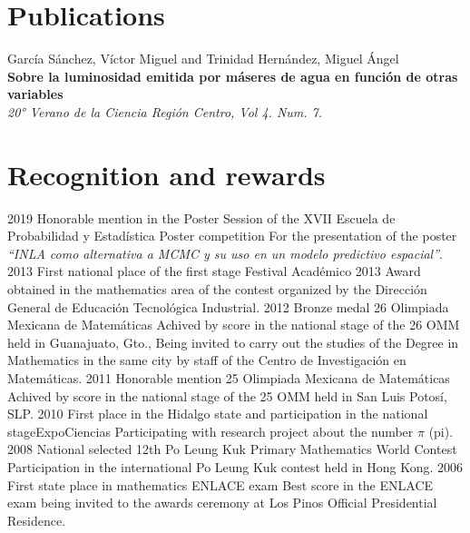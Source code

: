 \documentclass[]{friggeri-cv}
\begin{document}
\section{Publications}
García Sánchez, Víctor Miguel and Trinidad Hernández, Miguel Ángel\\
\textbf{Sobre la luminosidad emitida por máseres de agua en función de otras variables}\\
\emph{20° Verano de la Ciencia Región Centro, Vol 4. Num. 7.}
\section{Recognition and rewards}
\begin{entrylist}
  \entry
    {\hspace{0.9cm}2019}
    {Honorable mention in the Poster Session of the XVII Escuela de
Probabilidad y Estadística}
    {Poster competition}
    {For the presentation of the poster \emph{“INLA como alternativa a MCMC y su uso en un modelo predictivo espacial”}.}
    \entry
    {\hspace{0.9cm}2013}
    {First national place of the first stage}
    {Festival Académico 2013}
    {Award obtained in the mathematics area of the contest organized by the Dirección General de Educación Tecnológica Industrial.}
    \entry
    {\hspace{0.9cm}2012}
    {Bronze medal}
    {26 Olimpiada Mexicana de Matemáticas}
    {Achived by score in the national stage of the 26 OMM held in Guanajuato, Gto., Being invited to carry out the studies of the Degree in Mathematics in the same city by staff of the Centro de Investigación en Matemáticas.}
    \entry
    {\hspace{0.9cm}2011}
    {Honorable mention}
    {25 Olimpiada Mexicana de Matemáticas}
    {Achived by score in the national stage of the 25 OMM held in San Luis Potosí, SLP.}
    \entry
    {\hspace{0.9cm}2010}
    {First place in the Hidalgo state and participation in the national stage\hspace{10mm}}{ExpoCiencias}
    {Participating with research project about the number $\pi$ (pi).}
    \entry
    {\hspace{0.9cm}2008}
    {National selected}
    {12th Po Leung Kuk Primary Mathematics World Contest}
    {Participation in the international Po Leung Kuk contest held in Hong Kong.}
    \entry
    {\hspace{0.9cm}2006}
    {First state place in mathematics}
    {ENLACE exam}
    {Best score in the ENLACE exam being invited to the awards ceremony at Los Pinos Official Presidential Residence.}
\end{entrylist}

\end{document}
